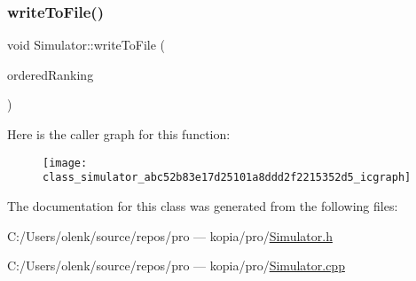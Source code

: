 \subsubsection{\texorpdfstring{writeToFile()}{writeToFile()}}
{\footnotesize\ttfamily void Simulator\+::write\+To\+File (\begin{DoxyParamCaption}\item[{std\+::set$<$ std\+::pair$<$ \mbox{\hyperlink{_simulator_8h_a93155c36d2ca378f207952fa62a0af6a}{Prefix\+And\+Infix\+Form}}, \mbox{\hyperlink{_simulator_8h_a0b2d4926f4b800d184280526d83a2a25}{result\+And\+Time\+Of\+Calc}} $>$, \mbox{\hyperlink{_simulator_8h_ae3c01f820fe5764de14452addf221c60}{Comparator}} $>$}]{ordered\+Ranking }\end{DoxyParamCaption})}

Here is the caller graph for this function\+:
\nopagebreak
\begin{figure}[H]
\begin{center}
\leavevmode
\texttt{[image: class\_simulator\_abc52b83e17d25101a8ddd2f2215352d5\_icgraph]}
\end{center}
\end{figure}


The documentation for this class was generated from the following files\+:\begin{DoxyCompactItemize}
\item 
C\+:/\+Users/olenk/source/repos/pro — kopia/pro/\mbox{\hyperlink{_simulator_8h}{Simulator.\+h}}\item 
C\+:/\+Users/olenk/source/repos/pro — kopia/pro/\mbox{\hyperlink{_simulator_8cpp}{Simulator.\+cpp}}\end{DoxyCompactItemize}
